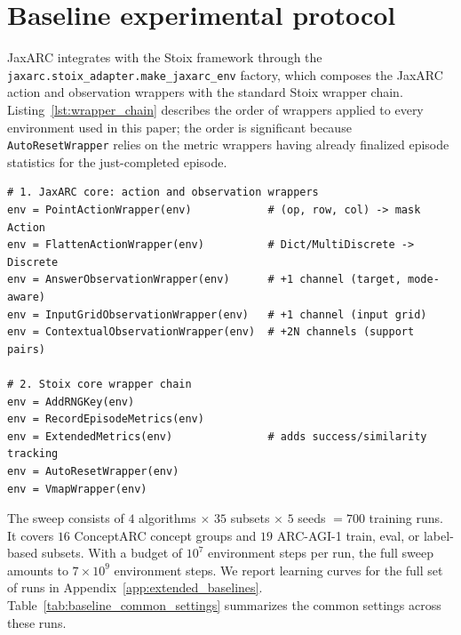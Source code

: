 \section{Baseline experimental protocol}
\label{app:stoix}

JaxARC integrates with the Stoix framework \citep{toledoStoixDistributedSingleagent2024} through the \texttt{jaxarc.stoix\_adapter.make\_jaxarc\_env} factory, which composes the JaxARC action and observation wrappers with the standard Stoix wrapper chain. Listing~\ref{lst:wrapper_chain} describes the order of wrappers applied to every environment used in this paper; the order is significant because \texttt{AutoResetWrapper} relies on the metric wrappers having already finalized episode statistics for the just-completed episode.

\begin{lstlisting}[style=jaxarcpython, caption={Wrapper chain composed around the JaxARC core for the baseline sweep.}, label={lst:wrapper_chain}]
# 1. JaxARC core: action and observation wrappers
env = PointActionWrapper(env)            # (op, row, col) -> mask Action
env = FlattenActionWrapper(env)          # Dict/MultiDiscrete -> Discrete
env = AnswerObservationWrapper(env)      # +1 channel (target, mode-aware)
env = InputGridObservationWrapper(env)   # +1 channel (input grid)
env = ContextualObservationWrapper(env)  # +2N channels (support pairs)

# 2. Stoix core wrapper chain
env = AddRNGKey(env)
env = RecordEpisodeMetrics(env)
env = ExtendedMetrics(env)               # adds success/similarity tracking
env = AutoResetWrapper(env)
env = VmapWrapper(env)
\end{lstlisting}

The sweep consists of $4$ algorithms $\times$ $35$ subsets $\times$ $5$ seeds $= 700$ training runs. It covers $16$ ConceptARC concept groups and $19$ ARC-AGI-1 train, eval, or label-based subsets. With a budget of $10^7$ environment steps per run, the full sweep amounts to $7\times 10^9$ environment steps. We report learning curves for the full set of runs in Appendix~\ref{app:extended_baselines}. Table~\ref{tab:baseline_common_settings} summarizes the common settings across these runs.

